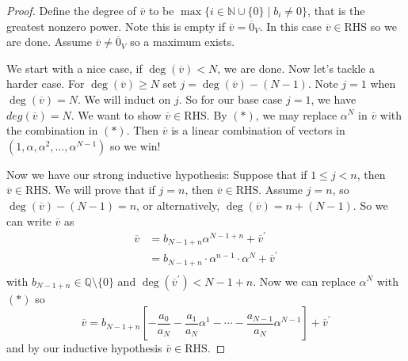 \begin{proof}
    Define the degree of \(\overline{v} \) to be \(\max\{ i \in \mathbb{N} \cup \{ 0 \} \mid b_i \neq 0  \} \), that is the greatest nonzero power. Note this is empty if \(\overline{v} = \overline{0}_V \). In this case \(\overline{v} \in \text{RHS} \) so we are done. Assume \(\overline{v} \neq \overline{0}_V \) so a maximum exists.
    
    We start with a nice case, if \(\deg(\overline{v} )< N\), we are done. Now let's tackle a harder case. For \(\deg(\overline{v} ) \geq N\) set \(j = \deg(\overline{v} ) - (N-1)\). Note \(j=1\) when \(\deg(\overline{v} ) = N\). We will induct on \(j\). So for our base case \(j=1\), we have \(deg(\overline{v} ) = N\). We want to show \(\overline{v} \in \text{RHS} \). By \((*)\), we may replace \(\alpha ^N\) in \(\overline{v} \) with the combination in \((*)\). Then \(\overline{v} \) is a linear combination of vectors in \((1, \alpha , \alpha ^2, \dots , \alpha ^{N-1})\) so we win!

    Now we have our strong inductive hypothesis: Suppose that if \(1 \leq j < n\), then \(\overline{v}  \in \text{RHS} \). We will prove that if \(j=n\), then \(\overline{v} \in \text{RHS} \). Assume \(j=n\), so \(\deg(\overline{v} )-(N-1) = n\), or alternatively, \(\deg(\overline{v}) = n+(N-1)\). So we can write \(\overline{v} \) as 
    \begin{align*}
        \overline{v} &= b_{N-1+n} \alpha ^{N-1+n} + \overline{v}^{\prime} \\
        &= b_{N-1+n}\cdot \alpha ^{n-1} \cdot \alpha ^N + \overline{v} ^{\prime}  \\ 
    \end{align*}
    with \(b_{N-1+n} \in \mathbb{Q} \setminus \{ 0 \}  \) and \(\deg(\overline{v}^{\prime} ) < N-1+n\). Now we can replace \(\alpha ^N\) with \((*)\) so
    \[
        \overline{v} = b_{N-1+n}\left[ - \frac{a_0}{a_N} - \frac{a_1}{a_N} \alpha ^1 - \cdots - \frac{a_{N-1} }{a_N} \alpha ^{N-1} \right] + \overline{v} ^{\prime} 
    \] 
    and by our inductive hypothesis \(\overline{v} \in \text{RHS} \). 
\end{proof}